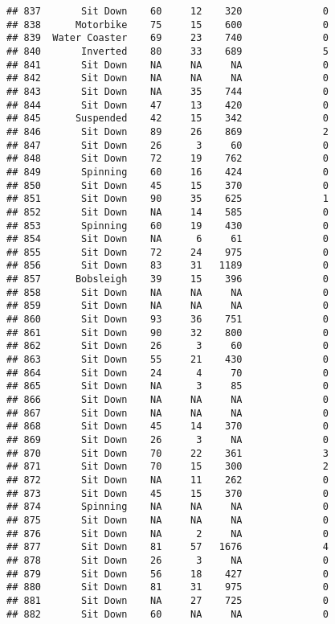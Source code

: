 \documentclass[
]{article}
\begin{document}
\begin{verbatim}
## 837       Sit Down    60     12    320              0
## 838      Motorbike    75     15    600              0
## 839  Water Coaster    69     23    740              0
## 840       Inverted    80     33    689              5
## 841       Sit Down    NA     NA     NA              0
## 842       Sit Down    NA     NA     NA              0
## 843       Sit Down    NA     35    744              0
## 844       Sit Down    47     13    420              0
## 845      Suspended    42     15    342              0
## 846       Sit Down    89     26    869              2
## 847       Sit Down    26      3     60              0
## 848       Sit Down    72     19    762              0
## 849       Spinning    60     16    424              0
## 850       Sit Down    45     15    370              0
## 851       Sit Down    90     35    625              1
## 852       Sit Down    NA     14    585              0
## 853       Spinning    60     19    430              0
## 854       Sit Down    NA      6     61              0
## 855       Sit Down    72     24    975              0
## 856       Sit Down    83     31   1189              0
## 857      Bobsleigh    39     15    396              0
## 858       Sit Down    NA     NA     NA              0
## 859       Sit Down    NA     NA     NA              0
## 860       Sit Down    93     36    751              0
## 861       Sit Down    90     32    800              0
## 862       Sit Down    26      3     60              0
## 863       Sit Down    55     21    430              0
## 864       Sit Down    24      4     70              0
## 865       Sit Down    NA      3     85              0
## 866       Sit Down    NA     NA     NA              0
## 867       Sit Down    NA     NA     NA              0
## 868       Sit Down    45     14    370              0
## 869       Sit Down    26      3     NA              0
## 870       Sit Down    70     22    361              3
## 871       Sit Down    70     15    300              2
## 872       Sit Down    NA     11    262              0
## 873       Sit Down    45     15    370              0
## 874       Spinning    NA     NA     NA              0
## 875       Sit Down    NA     NA     NA              0
## 876       Sit Down    NA      2     NA              0
## 877       Sit Down    81     57   1676              4
## 878       Sit Down    26      3     NA              0
## 879       Sit Down    56     18    427              0
## 880       Sit Down    81     31    975              0
## 881       Sit Down    NA     27    725              0
## 882       Sit Down    60     NA     NA              0

\end{verbatim}
\end{document}
